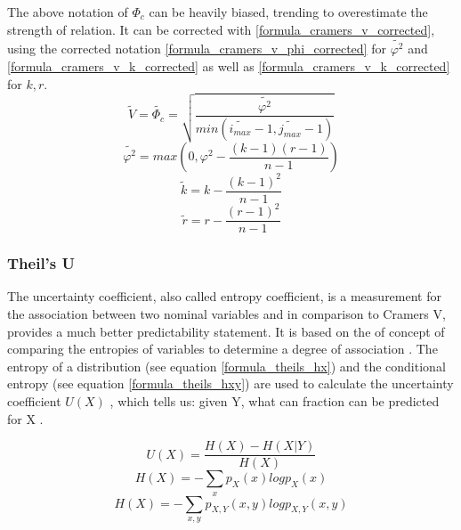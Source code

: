 \documentclass[a4paper,headsepline,footsepline,fontsize=11pt,BCOR=12mm,DIV=12]{report}
\begin{document}
The above notation of $\Phi_c$ can be heavily biased, trending to overestimate the strength of relation. It can be corrected with \ref{formula_cramers_v_corrected}, using the corrected notation \ref{formula_cramers_v_phi_corrected} for $\tilde{\varphi^2}$ and \ref{formula_cramers_v_k_corrected} as well as \ref{formula_cramers_v_k_corrected} for $k,r$. \cite{Bergsma2013}
\smallskip
\begin{equation}
\label{formula_cramers_v_corrected}
	\tilde{V} = \tilde{\Phi_c} = \sqrt{\frac{\tilde{\varphi^2}}{min(\tilde{i_{max}}-1,\tilde{j_{max}}-1)}}
\end{equation}
\begin{equation}
\label{formula_cramers_v_phi_corrected}
	\tilde{\varphi^2} = max(0,\varphi^2 - \frac{(k-1)(r-1)}{n-1})
\end{equation}
\begin{equation}
\label{formula_cramers_v_k_corrected}
	\tilde{k} = k - \frac{(k-1)^2}{n-1}
\end{equation}
\begin{equation}
\label{formula_cramers_v_r_corrected}
	\tilde{r} = r - \frac{(r-1)^2}{n-1}
\end{equation}

\bigskip

\subsubsection{Theil’s U}
The uncertainty coefficient, also called entropy coefficient, is a measurement for the association between two nominal variables and in comparison to Cramers V, provides a much better predictability statement. It is based on the of concept of comparing the entropies of variables to determine a degree of association \cite{Hoang2019}. The entropy of a distribution (see equation \ref{formula_theils_hx}) and the conditional entropy (see equation \ref{formula_theils_hxy}) are used to calculate the uncertainty coefficient $U(X)$ \cite{Glen2017,Glen2018}, which tells us: given Y, what can fraction can be predicted for X \cite{Hoang2019}.

\smallskip
\begin{equation}
\label{formula_theils}
	U(X) = \frac{H(X)-H(X|Y)}{H(X)}
\end{equation}
\begin{equation}
\label{formula_theils_hx}
	H(X) = -\sum_{x} p_{X}(x)log p_X(x)
\end{equation}
\begin{equation}
\label{formula_theils_hxy}
	H(X) = -\sum_{x,y} p_{X,Y}(x,y)log p_{X,Y}(x,y)
\end{equation}
\end{document}
